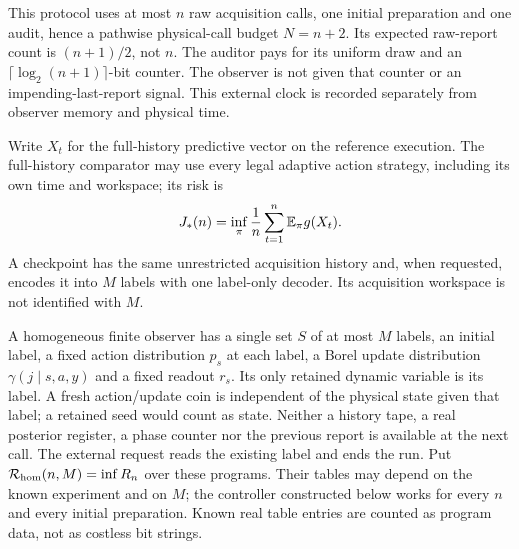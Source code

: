This protocol uses at most $n$ raw acquisition calls, one initial preparation and one audit, hence a pathwise physical-call budget $N=n+2$. Its expected raw-report count is $(n+1)/2$, not $n$. The auditor pays for its uniform draw and an $\lceil\log_2(n+1)\rceil$-bit counter. The observer is not given that counter or an impending-last-report signal. This external clock is recorded separately from observer memory and physical time.

Write $X_t$ for the full-history predictive vector on the reference execution. The full-history comparator may use every legal adaptive action strategy, including its own time and workspace; its risk is
\begin{equation}\label{eq:full}
 J_*(n)=\inf_\pi \frac1n\sum_{t=1}^n\mathbb E_\pi g(X_t).
\end{equation}
A checkpoint has the same unrestricted acquisition history and, when requested, encodes it into $M$ labels with one label-only decoder. Its acquisition workspace is not identified with $M$.

A homogeneous finite observer has a single set $S$ of at most $M$ labels, an initial label, a fixed action distribution $p_s$ at each label, a Borel update distribution $\gamma(j\mid s,a,y)$ and a fixed readout $r_s$. Its only retained dynamic variable is its label. A fresh action/update coin is independent of the physical state given that label; a retained seed would count as state. Neither a history tape, a real posterior register, a phase counter nor the previous report is available at the next call. The external request reads the existing label and ends the run. Put $\mathcal R_{\rm hom}(n,M)=\inf R_n$ over these programs. Their tables may depend on the known experiment and on $M$; the controller constructed below works for every $n$ and every initial preparation. Known real table entries are counted as program data, not as costless bit strings.
